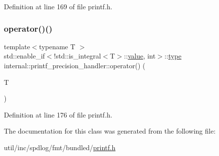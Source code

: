 Definition at line 169 of file printf.\+h.

\mbox{\label{classinternal_1_1printf__precision__handler_a59e46032e62563502408aa81b2ca7bdd}} 
\subsubsection{\texorpdfstring{operator()()}{operator()()}\hspace{0.1cm}{\footnotesize\ttfamily [2/2]}}
{\footnotesize\ttfamily template$<$typename T $>$ \\
std\+::enable\+\_\+if$<$!std\+::is\+\_\+integral$<$T$>$\+::\hyperlink{classinternal_1_1value}{value}, int$>$\+::\hyperlink{namespaceinternal_a8661864098ac0acff9a6dd7e66f59038}{type} internal\+::printf\+\_\+precision\+\_\+handler\+::operator() (\begin{DoxyParamCaption}\item[{T}]{ }\end{DoxyParamCaption})\hspace{0.3cm}{\ttfamily [inline]}}



Definition at line 176 of file printf.\+h.



The documentation for this class was generated from the following file\+:\begin{DoxyCompactItemize}
\item 
util/inc/spdlog/fmt/bundled/\hyperlink{printf_8h}{printf.\+h}\end{DoxyCompactItemize}

